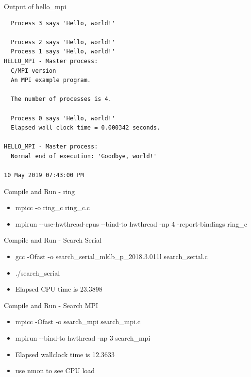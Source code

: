 \documentclass[ignorenonframetext,]{beamer}
\providecommand{\tightlist}{%
  \setlength{\itemsep}{0pt}\setlength{\parskip}{0pt}}
\begin{document}
\begin{frame}[fragile]{Output of hello\_mpi}

\begin{verbatim}
  Process 3 says 'Hello, world!'

  Process 2 says 'Hello, world!'
  Process 1 says 'Hello, world!'
HELLO_MPI - Master process:
  C/MPI version
  An MPI example program.

  The number of processes is 4.

  Process 0 says 'Hello, world!'
  Elapsed wall clock time = 0.000342 seconds.

HELLO_MPI - Master process:
  Normal end of execution: 'Goodbye, world!'

10 May 2019 07:43:00 PM
\end{verbatim}

\end{frame}

\begin{frame}{Compile and Run - ring}

\begin{itemize}
\tightlist
\item
  mpicc -o ring\_c ring\_c.c
\item
  mpirun -\/-use-hwthread-cpus -\/-bind-to hwthread -np 4
  -report-bindings ring\_c
\end{itemize}

\end{frame}

\begin{frame}{Compile and Run - Search Serial}

\begin{itemize}
\tightlist
\item
  gcc -Ofast -o search\_serial\_mklb\_p\_2018.3.011l search\_serial.c
\item
  ./search\_serial
\end{itemize}


\begin{itemize}
\tightlist
\item
  Elapsed CPU time is 23.3898
\end{itemize}

\end{frame}

\begin{frame}{Compile and Run - Search MPI}

\begin{itemize}
\item
  mpicc -Ofast -o search\_mpi search\_mpi.c
\item
  mpirun -\/-bind-to hwthread -np 3 search\_mpi
\item
  Elapsed wallclock time is 12.3633
\item
  use nmon to see CPU load
\end{itemize}

\end{frame}
\end{document}
